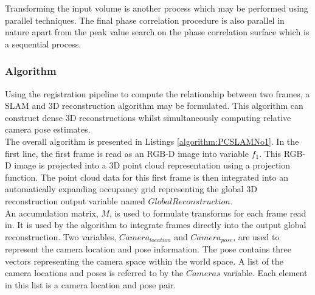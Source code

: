 Transforming the input volume is another process which may be performed using parallel techniques. The final phase correlation procedure is also parallel in nature apart from the peak value search on the phase correlation surface which is a sequential process. \\



\subsubsection{Algorithm}

Using the registration pipeline to compute the relationship between two frames, a SLAM and 3D reconstruction algorithm may be formulated. This algorithm can construct dense 3D reconstructions whilst simultaneously computing relative camera pose estimates. \\

 
The overall algorithm is presented in Listings \ref{algorithm:PCSLAMNo1}. In the first line, the first frame is read as an RGB-D image into variable $f_1$. This RGB-D image is projected into a 3D point cloud representation using a projection function. The point cloud data for this first frame is then integrated into an automatically expanding occupancy grid representing the global 3D reconstruction output variable named $GlobalReconstruction$. \\

An accumulation matrix, $M$, is used to formulate transforms for each frame read in. It is used by the algorithm to integrate frames directly into the output global reconstruction. Two variables, $Camera_{location}$ and $Camera_{pose}$, are used to represent the camera location and pose information. The pose contains three vectors representing the camera space within the world space. A list of the camera locations and poses is referred to by the $Cameras$ variable. Each element in this list is a camera location and pose pair. \\

